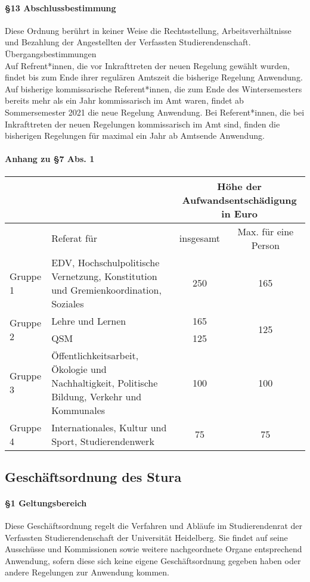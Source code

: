     \paragraph{§13 Abschlussbestimmung}
        Diese Ordnung berührt in keiner Weise die Rechtsstellung, Arbeitsverhältnisse und Bezahlung der Angestellten der Verfassten Studierendenschaft.\\
        Übergangsbestimmungen\\
        Auf Refrent*innen, die vor Inkrafttreten der neuen Regelung gewählt wurden, findet bis zum Ende ihrer regulären Amtszeit die bisherige Regelung Anwendung. \\
        Auf bisherige kommissarische Referent*innen, die zum Ende des Wintersemesters bereits mehr als ein Jahr kommissarisch im Amt waren, findet ab Sommersemester 2021 die neue Regelung Anwendung. Bei Referent*innen, die bei Inkrafttreten der neuen Regelungen kommissarisch im Amt sind, finden die bisherigen Regelungen für maximal ein Jahr ab Amtsende Anwendung.
    \paragraph{Anhang zu §7 Abs. 1}
        \begin{tabular}{|l|p{7cm}|c|c|}
            \hline
            &&\multicolumn{2}{|c|}{Höhe der Aufwandsentschädigung in Euro}\\\hline
            &Referat für & insgesamt & Max. für eine Person \\\hline\hline
            Gruppe 1&EDV, Hochschulpolitische Vernetzung, Konstitution und Gremienkoordination, Soziales&250&165\\\hline
            \multirow{2}{*}{Gruppe 2}&Lehre und Lernen&165&\multirow{2}{*}{125}\\\cline{2-2}
            &QSM&125&\\\hline
            Gruppe 3 & Öffentlichkeitsarbeit, Ökologie und Nachhaltigkeit, Politische Bildung, Verkehr und Kommunales & 100 & 100\\\hline
            Gruppe 4 & Internationales, Kultur und Sport, Studierendenwerk & 75 & 75\\\hline
        \end{tabular}
\subsection{Geschäftsordnung des Stura\label{appendix:5}}
    \paragraph{§1 Geltungsbereich}
        Diese Geschäftsordnung regelt die Verfahren und Abläufe im Studierendenrat der Verfassten Studierendenschaft der Universität Heidelberg. Sie findet auf seine Ausschüsse und Kommissionen sowie weitere nachgeordnete Organe entsprechend Anwendung, sofern diese sich keine eigene Geschäftsordnung gegeben haben oder andere Regelungen zur Anwendung kommen.
